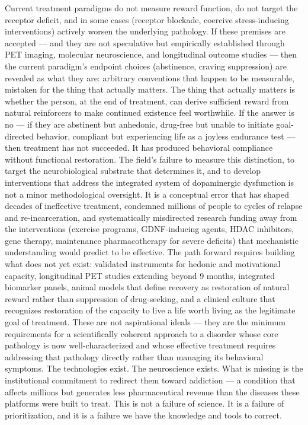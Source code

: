 \begin{enumerate}
  Current treatment paradigms do not measure reward function, do not target the receptor deficit, and in some cases (receptor blockade, coercive stress-inducing interventions) actively worsen the underlying pathology. If these premises are accepted --- and they are not speculative but empirically established through PET imaging, molecular neuroscience, and longitudinal outcome studies --- then the current paradigm's endpoint choices (abstinence, craving suppression) are revealed as what they are: arbitrary conventions that happen to be measurable, mistaken for the thing that actually matters. The thing that actually matters is whether the person, at the end of treatment, can derive sufficient reward from natural reinforcers to make continued existence feel worthwhile. If the answer is no --- if they are abstinent but anhedonic, drug-free but unable to initiate goal-directed behavior, compliant but experiencing life as a joyless endurance test --- then treatment has not succeeded. It has produced behavioral compliance without functional restoration. The field's failure to measure this distinction, to target the neurobiological substrate that determines it, and to develop interventions that address the integrated system of dopaminergic dysfunction is not a minor methodological oversight. It is a conceptual error that has shaped decades of ineffective treatment, condemned millions of people to cycles of relapse and re-incarceration, and systematically misdirected research funding away from the interventions (exercise programs, GDNF-inducing agents, HDAC inhibitors, gene therapy, maintenance pharmacotherapy for severe deficits) that mechanistic understanding would predict to be effective. The path forward requires building what does not yet exist: validated instruments for hedonic and motivational capacity, longitudinal PET studies extending beyond 9 months, integrated biomarker panels, animal models that define recovery as restoration of natural reward rather than suppression of drug-seeking, and a clinical culture that recognizes restoration of the capacity to live a life worth living as the legitimate goal of treatment. These are not aspirational ideals --- they are the minimum requirements for a scientifically coherent approach to a disorder whose core pathology is now well-characterized and whose effective treatment requires addressing that pathology directly rather than managing its behavioral symptoms. The technologies exist. The neuroscience exists. What is missing is the institutional commitment to redirect them toward addiction --- a condition that affects millions but generates less pharmaceutical revenue than the diseases these platforms were built to treat. This is not a failure of science. It is a failure of prioritization, and it is a failure we have the knowledge and tools to correct.
\end{enumerate}

